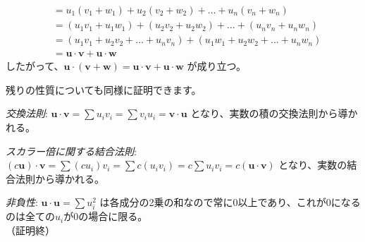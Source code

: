 \begin{thm}[内積の性質]
\begin{proof*}
\begin{align*}
&= u_1(v_1 + w_1) + u_2(v_2 + w_2) + \dots + u_n(v_n + w_n) \\
&= (u_1v_1 + u_1w_1) + (u_2v_2 + u_2w_2) + \dots + (u_nv_n + u_nw_n) \\
&= (u_1v_1 + u_2v_2 + \dots + u_nv_n) + (u_1w_1 + u_2w_2 + \dots + u_nw_n) \\
&= \bm{u} \cdot \bm{v} + \bm{u} \cdot \bm{w}
\end{align*}
したがって、$\bm{u} \cdot (\bm{v} + \bm{w}) = \bm{u} \cdot \bm{v} + \bm{u} \cdot \bm{w}$ が成り立つ。\par
残りの性質についても同様に証明できます。\par
\emph{交換法則}: $\bm{u} \cdot \bm{v} = \sum u_i v_i = \sum v_i u_i = \bm{v} \cdot \bm{u}$ となり、実数の積の交換法則から導かれる。\par
\emph{スカラー倍に関する結合法則}: $(c\bm{u}) \cdot \bm{v} = \sum (cu_i)v_i = \sum c(u_iv_i) = c\sum u_iv_i = c(\bm{u} \cdot \bm{v})$ となり、実数の結合法則から導かれる。\par
\emph{非負性}: $\bm{u} \cdot \bm{u} = \sum u_i^2$ は各成分の2乗の和なので常に0以上であり、これが0になるのは全ての$u_i$が0の場合に限る。\\
（証明終）
\end{proof*}
\end{thm}

